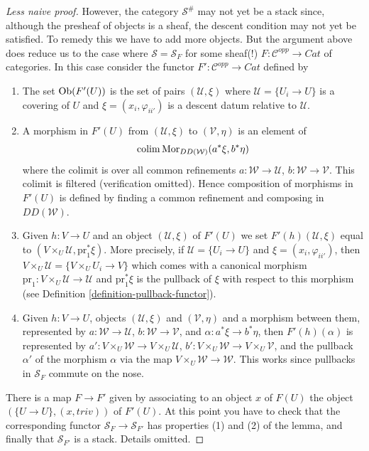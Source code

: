 \begin{proof}[Less naive proof]
\medskip\noindent
However, the category $\mathcal{S}^\#$ may not yet be a
stack since, although the presheaf of objects is a sheaf,
the descent condition may not yet be satisfied.
To remedy this we have to add more objects. But the argument
above does reduce us to the case where $\mathcal{S} = \mathcal{S}_F$
for some sheaf(!) $F : \mathcal{C}^{opp} \to \textit{Cat}$ of
categories. In this case consider the functor
$F' : \mathcal{C}^{opp} \to \textit{Cat}$ defined by
\begin{enumerate}
\item The set $\mathop{\mathrm{Ob}}\nolimits(F'(U))$ is the set of pairs
$(\mathcal{U}, \xi)$ where $\mathcal{U} = \{U_i \to U\}$
is a covering of $U$ and $\xi = (x_i, \varphi_{ii'})$ is
a descent datum relative to $\mathcal{U}$.
\item A morphism in $F'(U)$ from
$(\mathcal{U}, \xi)$ to $(\mathcal{V}, \eta)$
is an element of
$$
\mathop{\mathrm{colim}}\nolimits \mathop{\mathrm{Mor}}\nolimits_{DD(\mathcal{W})}(a^*\xi, b^*\eta)
$$
where the colimit is over all common refinements
$a : \mathcal{W} \to \mathcal{U}$, $b : \mathcal{W} \to \mathcal{V}$.
This colimit is filtered (verification omitted).
Hence composition of morphisms in $F'(U)$ is defined by
finding a common refinement and composing in $DD(\mathcal{W})$.
\item Given $h : V \to U$ and an object
$(\mathcal{U}, \xi)$ of $F'(U)$ we set $F'(h)(\mathcal{U}, \xi)$
equal to $(V \times_U \mathcal{U}, \text{pr}_1^*\xi)$.
More precisely, if $\mathcal{U} = \{U_i \to U\}$
and $\xi = (x_i, \varphi_{ii'})$, then
$V \times_U \mathcal{U} = \{V \times_U U_i \to V\}$
which comes with a canonical morphism
$\text{pr}_1 : V \times_U \mathcal{U} \to \mathcal{U}$ and
$\text{pr}_1^*\xi$ is the pullback of $\xi$ with respect to
this morphism (see Definition \ref{definition-pullback-functor}).
\item Given $h : V \to U$, objects $(\mathcal{U}, \xi)$
and $(\mathcal{V}, \eta)$ and a morphism between them, represented by
$a : \mathcal{W} \to \mathcal{U}$, $b : \mathcal{W} \to \mathcal{V}$,
and $\alpha : a^*\xi \to b^*\eta$, then $F'(h)(\alpha)$ is
represented by
$a' : V \times_U\mathcal{W} \to V \times_U\mathcal{U}$,
$b' : V \times_U\mathcal{W} \to V \times_U\mathcal{V}$,
and the pullback $\alpha'$ of the morphism $\alpha$ via
the map $V \times_U \mathcal{W} \to \mathcal{W}$. This works
since pullbacks in $\mathcal{S}_F$ commute on the nose.
\end{enumerate}
There is a map $F \to F'$ given by associating to
an object $x$ of $F(U)$ the object $(\{U \to U\}, (x, triv))$ of
$F'(U)$. At this point you have to check that the corresponding
functor $\mathcal{S}_F \to \mathcal{S}_{F'}$ has properties (1)
and (2) of the lemma, and finally that $\mathcal{S}_{F'}$ is
a stack. Details omitted.
\end{proof}

